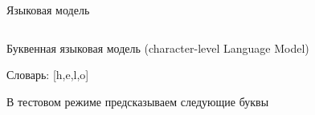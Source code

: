 \documentclass[notes,12pt, aspectratio=169]{beamer}
\newenvironment{wideitemize}{\itemize\addtolength{\itemsep}{10pt}}{\enditemize}
\begin{document}
\begin{frame}{Языковая модель}
	\begin{columns}
		\begin{column}{.4\linewidth}
			\begin{wideitemize} 
				\item  Буквенная языковая модель (character-level Language Model)
				\item Словарь:  [h,e,l,o]
				\item В тестовом режиме предсказываем следующие буквы
			\end{wideitemize}
		\end{column}	
		\begin{column}{.7\linewidth}			
			\begin{center}

\end{center}
\end{column}
\end{columns}
\end{frame}
\end{document}
